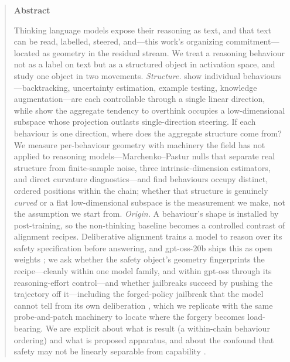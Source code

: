 \documentclass[10pt]{article}
\begin{document}
\begin{quote}
\begin{center}\textbf{\large Abstract}\end{center}
\small
Thinking language models expose their reasoning as text, and that text can be
read, labelled, steered, and---this work's organizing commitment---located as
geometry in the residual stream. We treat a reasoning behaviour not as a label on
text but as a structured object in activation space, and study one object in two
movements. \emph{Structure.} \citet{venhoff2025reasoning} show individual
behaviours---backtracking, uncertainty estimation, example testing, knowledge
augmentation---are each controllable through a single linear direction, while
\citet{huang2025manifold} show the aggregate tendency to overthink occupies a
low-dimensional subspace whose projection outlasts single-direction steering. If
each behaviour is one direction, where does the aggregate structure come from? We
measure per-behaviour geometry with machinery the field has not applied to
reasoning models---Marchenko--Pastur nulls that separate real structure from
finite-sample noise, three intrinsic-dimension estimators, and direct curvature
diagnostics---and find behaviours occupy distinct, ordered positions within the
chain; whether that structure is genuinely \emph{curved} or a flat low-dimensional
subspace is the measurement we make, not the assumption we start from.
\emph{Origin.} A behaviour's shape is installed by post-training, so the
non-thinking baseline becomes a controlled contrast of alignment recipes.
Deliberative alignment \citep{guan2024deliberative} trains a model to reason over
its safety specification before answering, and \mbox{gpt-oss-20b} ships this as
open weights \citep{openai2025gptoss}; we ask whether the safety object's geometry
fingerprints the recipe---cleanly within one model family, and within gpt-oss
through its reasoning-effort control---and whether jailbreaks succeed by pushing
the trajectory off it---including the forged-policy jailbreak that the model cannot
tell from its own deliberation \citep{ye2025luckycoin}, which we replicate with the
same probe-and-patch machinery to locate where the forgery becomes load-bearing. We
are explicit about
what is result (a within-chain behaviour ordering) and what is proposed apparatus,
and about the confound that safety may not be linearly separable from capability
\citep{ponkshe2025safety}.
\end{quote}
\vspace{0.4em}
\end{document}
